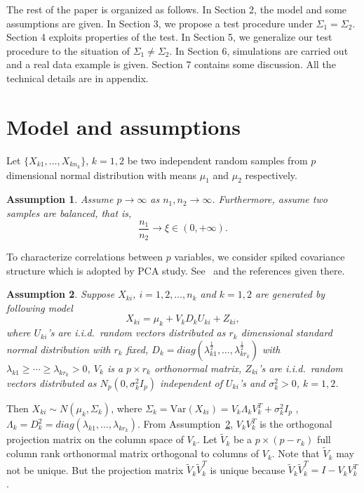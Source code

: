 \documentclass[review]{elsarticle}
\theoremstyle{plain}
\newtheorem{assumption}{\quad\quad Assumption}
\theoremstyle{definition}
\theoremstyle{remark}
\begin{document}
The rest of the paper is organized as follows. In Section 2,  the model and some assumptions are given.  In Section 3, we propose a test procedure under $\Sigma_1=\Sigma_2$. Section 4 exploits properties of the test. In Section 5, we generalize our test procedure to the situation of $\Sigma_1\neq \Sigma_2$. In Section 6, simulations are carried out and  a real data example is given. Section 7 contains some discussion. All the technical details are in appendix.

\section{Model and assumptions}


Let $\{X_{k1},\ldots,X_{kn_k}\}$, $k=1, 2$ be two independent  random samples from $p$ dimensional normal distribution with means $\mu_1$ and $\mu_2$ respectively.

\begin{assumption}\label{balance}
Assume $p\to \infty$ as $n_1, n_2\to \infty$. Furthermore, assume two samples are balanced, that is,
\begin{equation*}
    \frac{n_1}{n_2}\to \xi \in (0,+\infty).
\end{equation*}
\end{assumption}

To characterize correlations between $p$ variables, we consider spiked covariance structure which is adopted by PCA study. See~\cite{Cai2012Sparse} and the references given there.
\begin{assumption}\label{theModel}
Suppose $X_{ki}$, $i=1,2,\ldots,n_k$ and $k=1,2$ are generated by  following model
\begin{equation*}
X_{ki}=\mu_k+V_k D_k U_{ki}+Z_{ki},
\end{equation*}
where
$U_{ki}$'s are i.i.d.\  random vectors distributed as $r_k$ dimensional standard normal distribution with $r_k$ fixed, 
$D_k=diag(\lambda_{k1}^{\frac{1}{2}},\ldots,\lambda_{k{r_k}}^{\frac{1}{2}})$ with $\lambda_{k1}\geq \cdots \geq \lambda_{k{r_k}}>0$,
$V_k$ is  a $p\times r_k$ orthonormal matrix, $Z_{ki}$'s are i.i.d.\ random vectors distributed as  $N_p(0,\sigma^2_k I_p)$ independent of $U_{ki}$'s and $\sigma^2_k>0$, $k=1,2$.
\end{assumption}
Then $X_{ki}\sim N(\mu_k,\Sigma_k)$, where $ 
\Sigma_k=\textrm{Var}(X_{ki})=V_k\Lambda_k V_k^T+\sigma^2_k I_p
$
, $\Lambda_k=D_k^2=diag(\lambda_{k1},\ldots,\lambda_{k{r_k}})$.
From Assumption~\ref{theModel}, $V_k V_k^T$ is the orthogonal projection matrix on the column space of $V_k$. Let $\tilde{V}_k$ be a $p\times (p-r_k)$ full column rank orthonormal matrix orthogonal to columns of  $V_k$.
 Note that $\tilde{V}_k$ may not be unique. But the projection matrix $\tilde{V}_k\tilde{V}_k^T$ is unique because $\tilde{V}_k\tilde{V}_k^T=I-V_k V_k^T$.
\end{document}
